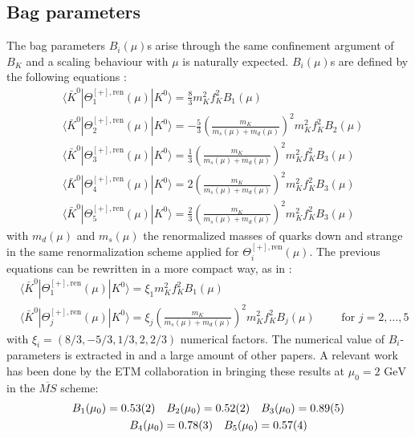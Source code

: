 \documentclass[english, LaM, oneside, noexaminfo]{sapthesis}
\newcommand{\la}{\langle}
\newcommand{\ra}{\rangle}
\newcommand{\ren}{{\text{ren}}}
\newcommand{\gev}{\text{ GeV}}
\begin{document}
\subsection{Bag parameters}
\noindent
The bag parameters $B_i(\mu)$s arise through the same confinement argument of $B_K$ and a scaling behaviour with $\mu$ is naturally expected.
$B_i(\mu)$s are defined by the following equations \cite{Bparameters}:
\begin{equation*}
    \begin{aligned}
        & \la \bar K^0 | \Theta_1^{[+],\ren}(\mu) | K^0 \ra = \frac{8}{3} m_K^2 f_K^2 B_1(\mu) \\
        & \la \bar K^0 | \Theta_2^{[+],\ren}(\mu) | K^0 \ra = -\frac{5}{3} \left(\frac{m_K}{m_s(\mu)+m_d(\mu)}\right)^2 m_K^2 f_K^2 B_2(\mu) \\
        & \la \bar K^0 | \Theta_3^{[+],\ren}(\mu) | K^0 \ra = \frac{1}{3} \left(\frac{m_K}{m_s(\mu)+m_d(\mu)}\right)^2 m_K^2 f_K^2 B_3(\mu) \\
        & \la \bar K^0 | \Theta_4^{[+],\ren}(\mu) | K^0 \ra = 2 \left(\frac{m_K}{m_s(\mu)+m_d(\mu)}\right)^2 m_K^2 f_K^2 B_3(\mu) \\
        & \la \bar K^0 | \Theta_5^{[+],\ren}(\mu) | K^0 \ra = \frac{2}{3} \left(\frac{m_K}{m_s(\mu)+m_d(\mu)}\right)^2 m_K^2 f_K^2 B_3(\mu)
    \end{aligned}
\end{equation*}
with $m_d (\mu)$ and $m_s (\mu)$ the renormalized masses of quarks down and strange in the same renormalization scheme applied for $\Theta_i^{[+],\ren}(\mu)$.
The previous equations can be rewritten in a more compact way, as in \cite{KMBSM}:
\begin{equation}\label{eq:bag-definition}
    \begin{aligned}
        & \la \bar K^0 | \Theta_1^{[+],\ren}(\mu) | K^0 \ra = \xi_1 m_K^2 f_K^2 B_1(\mu) \\
        & \la \bar K^0 | \Theta_j^{[+],\ren}(\mu) | K^0 \ra = \xi_j \left(\frac{m_K}{m_s(\mu)+m_d(\mu)}\right)^2 m_K^2 f_K^2 B_j(\mu) \quad \quad \text{ for } j=2,\dots,5
    \end{aligned}
\end{equation}
with $\xi_i = \left(8/3, -5/3, 1/3, 2, 2/3\right)$ numerical factors.
The numerical value of $B_i$-parameters is extracted in \cite{Bparameters} and a large amount of other papers.
A relevant work has been done by the ETM collaboration in \cite{KMBSM} bringing these results at $\mu_0 = 2\gev$ in the $\overline{MS}$ scheme:
\begin{equation}\label{eq:b_i-in-kmbsm}
    \begin{aligned}
        & B_1(\mu_0) = 0.53(2) \quad B_2(\mu_0) = 0.52(2) \quad B_3(\mu_0) = 0.89(5) \\
        & \hspace*{18mm} B_4(\mu_0) = 0.78(3) \quad B_5(\mu_0) = 0.57(4)
    \end{aligned}
\end{equation}
\end{document}
